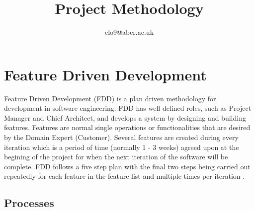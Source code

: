 \documentclass{article}
\title{Project Methodology}
\author{elo9@aber.ac.uk}
\begin{document}
\maketitle
\tableofcontents

\newpage

\section{Feature Driven Development}
Feature Driven Development (FDD) is a plan driven methodology for development in software engineering. FDD has well defined roles, such as Project Manager and Chief Architect, and develops a system by designing and building features. Features are normal single operations or functionalities that are desired by the Domain Expert (Customer). Several features are created during every iteration which is a period of time (normally 1 - 3 weeks) agreed upon at the begining of the project for when the next iteration of the software will be complete. FDD follows a five step plan with the final two steps being carried out repeatedly for each feature in the feature list and multiple times per iteration \cite{FDDandAgile}.

\subsection{Processes}
\end{document}
